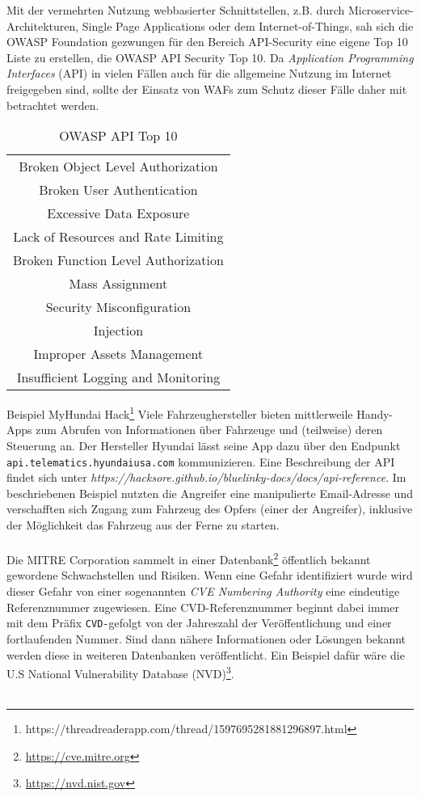 Mit der vermehrten Nutzung webbasierter Schnittstellen, z.B. durch Microservice-Architekturen, Single Page Applications oder dem Internet-of-Things, sah sich die OWASP Foundation gezwungen für den Bereich API-Security eine eigene Top 10 Liste zu erstellen, die OWASP API Security Top 10\cite{owaspapi10}. Da \emph{Application Programming Interfaces} (API) in vielen Fällen auch für die allgemeine Nutzung im Internet freigegeben sind, sollte der Einsatz von WAFs zum Schutz dieser Fälle daher mit betrachtet werden. 

\begin{table}[ht]
    \centering
    \begin{tabular}{|c|}
    \hline
         Broken Object Level Authorization   \\
         Broken User Authentication  \\
         Excessive Data Exposure  \\
         Lack of Resources and Rate Limiting  \\
         Broken Function Level Authorization  \\
         Mass Assignment  \\
         Security Misconfiguration  \\
         Injection  \\
         Improper Assets Management  \\
         Insufficient Logging and Monitoring  \\
         \hline
    \end{tabular}
    \caption{OWASP API Top 10}
    \label{tab:owaspapitop10}
\end{table}

\textcolor{bhtGray}{ Beispiel MyHundai Hack\footnote{https://threadreaderapp.com/thread/1597695281881296897.html}} Viele Fahrzeughersteller bieten mittlerweile Handy-Apps zum Abrufen von Informationen über Fahrzeuge und (teilweise) deren Steuerung an. Der Hersteller Hyundai lässt seine App dazu über den Endpunkt \texttt{api.telematics.hyundaiusa.com} kommunizieren. Eine Beschreibung der API findet sich unter \emph{https://hacksore.github.io/bluelinky-docs/docs/api-reference}. Im beschriebenen Beispiel nutzten die Angreifer eine manipulierte Email-Adresse und verschafften sich Zugang zum Fahrzeug des Opfers (einer der Angreifer), inklusive der Möglichkeit das Fahrzeug aus der Ferne zu starten. \\\\

Die MITRE Corporation sammelt in einer Datenbank\footnote{\url{https://cve.mitre.org}} öffentlich bekannt gewordene Schwachstellen und Risiken. Wenn eine Gefahr identifiziert wurde wird dieser Gefahr von einer sogenannten \emph{CVE Numbering Authority} eine eindeutige Referenznummer zugewiesen. Eine CVD-Referenznummer beginnt dabei immer mit dem Präfix \glqq\verb=CVD-=\grqq gefolgt von der Jahreszahl der Veröffentlichung und einer fortlaufenden Nummer. Sind dann nähere Informationen oder Lösungen bekannt werden diese in weiteren Datenbanken veröffentlicht. Ein Beispiel dafür wäre die U.S National Vulnerability Database (NVD)\footnote{\url{https://nvd.nist.gov}}.\\\\

